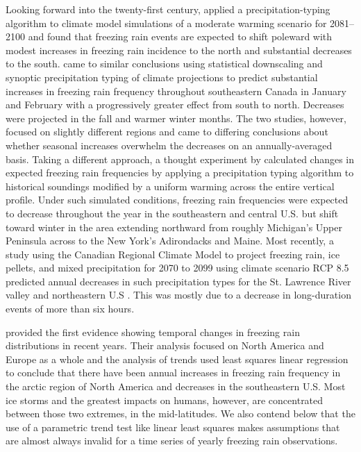 \documentclass[twocol]{ametsoc}
\begin{document}
Looking forward into the twenty-first century, \citet{lambert2011simulated} applied a precipitation-typing algorithm to climate model simulations of a moderate warming scenario for 2081--2100 and found that freezing rain events are expected to shift poleward with modest increases in freezing rain incidence to the north and substantial decreases to the south. \citet{cheng2011possible} came to similar conclusions using statistical downscaling and synoptic precipitation typing of climate projections to predict substantial increases in freezing rain frequency throughout southeastern Canada in January and February with a progressively greater effect from south to north. Decreases were projected in the fall and warmer winter months. The two studies, however, focused on slightly different regions and came to differing conclusions about whether seasonal increases overwhelm the decreases on an annually-averaged basis. Taking a different approach, a thought experiment by \citet{klima2015ice} calculated changes in expected freezing rain frequencies by applying a precipitation typing algorithm to historical soundings modified by a uniform warming across the entire vertical profile. Under such simulated conditions, freezing rain frequencies were expected to decrease throughout the year in the southeastern and central U.S. but shift toward winter in the area extending northward from roughly Michigan's Upper Peninsula across to the New York's Adirondacks and Maine. Most recently, a study using the Canadian Regional Climate Model to project freezing rain, ice pellets, and mixed precipitation for 2070 to 2099 using climate scenario RCP 8.5 predicted annual decreases in such precipitation types for the St. Lawrence River valley and northeastern U.S \citep{matte2018mixed}. This was mostly due to a decrease in long-duration events of more than six hours. 

\citet{groisman2016recent} provided the first evidence showing temporal changes in freezing rain distributions in recent years. Their analysis focused on North America and Europe as a whole and the analysis of trends used least squares linear regression to conclude that there have been annual increases in freezing rain frequency in the arctic region of North America and decreases in the southeastern U.S. Most ice storms and the greatest impacts on humans, however, are concentrated between those two extremes, in the mid-latitudes. We also contend below that the use of a parametric trend test like linear least squares makes assumptions that are almost always invalid for a time series of yearly freezing rain observations.
\end{document}
